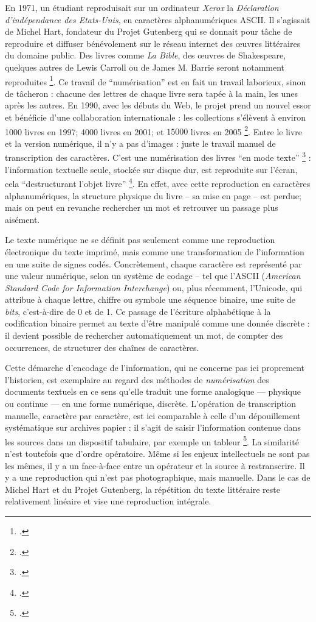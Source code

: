 En 1971, un étudiant reproduisait sur un ordinateur \emph{Xerox} la \emph{Déclaration d'indépendance des Etats-Unis}, en caractères alphanumériques ASCII. Il s'agissait de Michel Hart, fondateur du Projet Gutenberg qui se donnait pour tâche de reproduire et diffuser bénévolement sur le réseau internet des œuvres littéraires du domaine public. Des livres comme \emph{La Bible}, des œuvres de Shakespeare, quelques autres de Lewis Carroll ou de James M. Barrie seront notamment reproduites \footcite[][]{lebert}. Ce travail de \enquote{numérisation} est en fait un travail laborieux, sinon de tâcheron : chacune des lettres de chaque livre sera tapée à la main, les unes après les autres. En 1990, avec les débuts du Web, le projet prend un nouvel essor et bénéficie d'une collaboration internationale : les collections s'élèvent à environ 1000 livres en 1997; 4000 livres en 2001; et $15000$ livres en 2005 \footcite[][]{lebert}. Entre le livre et la version numérique, il n'y a pas d'images : juste le travail manuel de transcription des caractères. C'est une numérisation des livres \enquote{en mode texte} \footcite[][30-33]{bermesbook} : l'information textuelle seule, stockée sur disque dur, est reproduite sur l'écran, cela \enquote{destructurant l'objet livre} \footcite[][]{bermesbook}. En effet, avec cette reproduction en caractères alphanumériques, la structure physique du livre -- sa mise en page -- est perdue; mais on peut en revanche rechercher un mot et retrouver un passage plus aisément. 

Le texte numérique ne se définit pas seulement comme une reproduction électronique du texte imprimé, mais comme une transformation de l’information en une suite de signes codés. Concrètement, chaque caractère est représenté par une valeur numérique, selon un système de codage -- tel que l’ASCII (\emph{American Standard Code for Information Interchange}) ou, plus récemment, l’Unicode, qui attribue à chaque lettre, chiffre ou symbole une séquence binaire, une suite de \emph{bits}, c’est-à-dire de 0 et de 1. Ce passage de l’écriture alphabétique à la codification binaire permet au texte d’être manipulé comme une donnée discrète : il devient possible de rechercher automatiquement un mot, de compter des occurrences, de structurer des chaînes de caractères.

Cette démarche d'encodage de l'information, qui ne concerne pas ici proprement l’historien, est exemplaire au regard des méthodes de \emph{numérisation} des documents textuels en ce sens qu’elle traduit une forme analogique — physique ou continue — en une forme numérique, discrète. L’opération de transcription manuelle, caractère par caractère, est ici comparable à celle d’un dépouillement systématique sur archives papier : il s’agit de saisir l’information contenue dans les sources dans un dispositif tabulaire, par exemple un tableur \footcite[][]{zalc}. La similarité n’est toutefois que d’ordre opératoire. Même si les enjeux intellectuels ne sont pas les mêmes, il y a un face-à-face entre un opérateur et la source à restranscrire. Il y a une reproduction qui n'est pas photographique, mais manuelle. Dans le cas de Michel Hart et du Projet Gutenberg, la répétition du texte littéraire reste relativement linéaire et vise une reproduction intégrale. 

